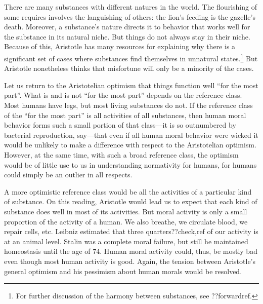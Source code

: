 There are many substances with different natures in the world. The flourishing of some requires involves the languishing
of others: the lion's feeding is the gazelle's death. Moreover, a substance's nature directs it to behavior that works
well for the substance in its natural niche. But things do not always stay in their niche. Because of this, Aristotle
has many resources for explaining why there is a significant set of cases where substances find themselves in unnatural
states.\footnote{For further discussion of the harmony between substances, see ??forwardref.} But Aristotle nonetheless
thinks that misfortune will only be a minority of the cases.

Let us return to the Aristotelian optimism that things function well ``for the most part''. What is and is not
``for the most part'' depends on the reference class. Most humans have legs, but most living substances do not. 
If the reference class of the ``for the most part'' is all activities of all substances, then human moral behavior
forms such a small portion of that class---it is so outnumbered by bacterial reproduction, say---that even if 
all human moral behavior were wicked it would be unlikely to make a difference with respect to the Aristotelian
optimism. However, at the same time, with such a broad reference class, the optimism would be of little use to us
in understanding normativity for humans, for humans could simply be an outlier in all respects. 

A more optimistic reference class would be all the activities of a particular kind of substance. On this reading, 
Aristotle would lead us to expect that each kind of substance does well in most of its activities. But moral activity
is only a small proportion of the activity of a human. We also breathe, we circulate blood, we repair cells, etc. Leibniz 
estimated that three quarters??check,ref of our activity is at an animal level. Stalin was a complete moral failure, but
still he maintained homeostasis until the age of 74. Human moral activity could, thus, be mostly bad even though most
human activity is good. Again, the tension between Aristotle's general optimism and his pessimism about human morals
would be resolved.

